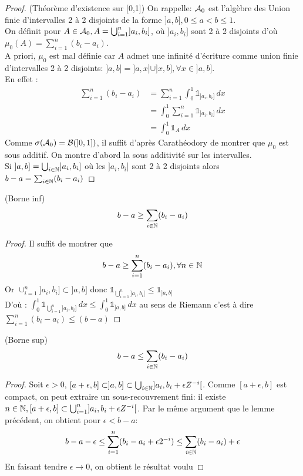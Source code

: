 \documentclass[]{report}
\begin{document}
    \begin{proof}{(Théorème d'existence sur [0,1])}{}
        On rappelle: $\mathcal{A}_0$ est l'algèbre des Union finie d'intervalles 2 à 2 disjoints de la forme $]a,b],0\le a<b\le 1$.\\
        On définit pour $A\in\mathcal{A}_0,A=\bigcup_{i=1}^n]a_i,b_i]$, où $]a_i,b_i]$ sont 2 à 2 disjoints d'où $\mu_0(A)=\sum_{i=1}^{n}(b_i-a_i)$.\\
        A priori, $\mu_0$ est mal définie car $A$ admet une infinité d'écriture comme union finie d'intervalles 2 à 2 disjoints:
        $]a,b]=]a,x]\cup]x,b],\forall x\in]a,b]$.\\
        En effet :
        \begin{align*}
            \sum_{i=1}^{n}(b_i-a_i)&=\sum_{i=1}^{n}\int_{0}^{1}\mathbb{1}_{]a_i,b_i]}\, dx\\
            &=\int_{0}^{1}\sum_{i=1}^{n}\mathbb{1}_{]a_i,b_i]}\, dx\\
            &=\int_{0}^{1}\mathbb{1}_A\, dx
        \end{align*}
        Comme $\sigma(\mathcal{A}_0)=\mathcal{B}(]0,1])$, il suffit d'après Carathéodory de montrer que $\mu_0$ est sous additif. On montre d'abord la sous additivité sur les intervalles.\\
        Si $]a,b]=\bigcup_{i\in\mathbb{N}}]a_i,b_i]$ où les $]a_i,b_i]$ sont 2 à 2 disjoints alors $b-a=\sum_{i\in\mathbb{N}}(b_i-a_i)$
    \end{proof}

    \begin{lm}{}{(Borne inf)}
        \[b-a\ge \sum_{i\in\mathbb{N}}(b_i-a_i)\]
    \end{lm}

    \begin{proof}{}{}
        Il suffit de montrer que 
        \[b-a\ge\sum_{i=1}^{n}(b_i-a_i),\forall n\in\mathbb{N}\]
        Or $\cup_{i=1}^n]a_i,b_i]\subset ]a,b]$ donc $\mathbb{1}_{\bigcup_{i=1}^n]a_i,b_i]}\le \mathbb{1}_{]a,b]}$\\
        D'où : $\int_{0}^{1} \mathbb{1}_{\bigcup_{i=1}^n]a_i,b_i]}\, dx\le\int_{0}^{1}\mathbb{1}_{]a,b]}\, dx$ au sens de Riemann c'est à dire $\sum_{i=1}^{n}(b_i-a_i)\le(b-a)$
    \end{proof}

    \begin{lm}{}{(Borne sup)}
        \[b-a\le \sum_{i\in\mathbb{N}}(b_i-a_i)\]
    \end{lm}

    \begin{proof}{}{}
        Soit $\epsilon>0$, $[a+\epsilon,b]\subset]a,b]\subset\bigcup_{i\in\mathbb{N}}]a_i,b_i+\epsilon Z^{-i}[$. Comme $[a+\epsilon,b]$ est compact, on peut extraire un sous-recouvrement fini: il existe $n\in\mathbb{N},[a+\epsilon,b]\subset \bigcup_{i=1}^n]a_i,b_i+\epsilon Z^{-i}[$. Par le même argument que le lemme précédent, on obtient pour $\epsilon<b-a$:
        \[b-a-\epsilon\le\sum_{i=1}^{n}(b_i-a_i+\epsilon 2^{-i})\le \sum_{i\in\mathbb{N}}(b_i-a_i)+\epsilon\]
        En faisant tendre $\epsilon\to 0$, on obtient le résultat voulu
    \end{proof}
\end{document}

